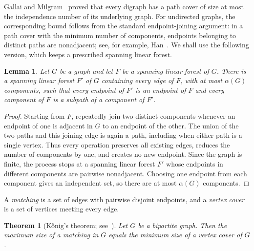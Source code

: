 \documentclass[11pt,a4paper]{article}
\newtheorem{theorem}{Theorem}[section]
\newtheorem{lemma}[lemma]{Lemma}
\theoremstyle{remark}
\numberwithin{equation}{section}
\begin{document}
	Gallai and Milgram~\cite{GM} proved that every digraph has a path cover
	of size at most the independence number of its underlying graph.
	For undirected graphs, the corresponding bound follows from the standard
	endpoint-joining argument: in a path cover with the minimum number of
	components, endpoints belonging to distinct paths are nonadjacent; see,
	for example, Han~\cite{Han}. We shall use the following version, which
	keeps a prescribed spanning linear forest.
	\begin{lemma}\label{lem:forest}
		Let $G$ be a graph and let $F$ be a spanning linear forest of $G$.
		There is a spanning linear forest $F'$ of $G$ containing every edge of $F$, with at most $\alpha(G)$
		components, such that every endpoint of $F'$ is an endpoint of $F$ and every component of $F$ is a subpath of
		a component of $F'$.
	\end{lemma}
	\begin{proof}
		Starting from $F$, repeatedly join two distinct components whenever an endpoint of one is adjacent in $G$
		to an endpoint of the other.
		The union of the two paths and this joining edge is again a path, including when either path is a
		single vertex.
		Thus every operation preserves all existing edges, reduces the number of components by one, and
		creates no new endpoint.
		Since the graph is finite, the process stops at a spanning linear forest $F'$ whose endpoints in
		different components are pairwise nonadjacent.
		Choosing one endpoint from each component gives an independent set, so there are at most $\alpha(G)$
		components.
	\end{proof}
	A \emph{matching} is a set of edges with pairwise disjoint endpoints, and a \emph{vertex cover} is a
	set of vertices meeting every edge.
	
	\begin{theorem}[K\H{o}nig's theorem; see~\cite{BM}]
		\label{thm:konig}
		Let $G$ be a bipartite graph. Then the maximum size of a matching
		in $G$ equals the minimum size of a vertex cover of $G$.
	\end{theorem}
	
\end{document}
